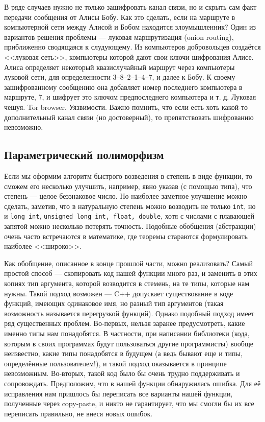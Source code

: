 \documentclass{book}
\begin{document}
В ряде случаев нужно не только зашифровать канал связи, но и скрыть сам факт передачи сообщения от
Алисы Бобу. Как это сделать, если на маршруте в компьютерной сети между Алисой и Бобом находится
злоумышленник? Один из вариантов решения проблемы --- луковая маршрутизация (onion routing),
приближенно сводящаяся к слудующему. Из компьютеров добровольцев создаётся <<луковая сеть>>,
компьютеры которой дают свои ключи шифрования Алисе. Алиса определяет некоторый квазислучайный
маршрут через компьютеры луковой сети, для определенности 3--8--2--1--4--7, и далее к Бобу. К
своему зашифрованному сообщению она добавляет номер последнего компьютера в маршруте, 7, и шифрует
это ключом предпоследнего компьютера и т. д. Луковая чешуя. Tor browser. Уязвимости. Важно помнить,
что если есть хоть какой-то дополнительный канал связи (но достоверный), то препятствовать
шифрованию невозможно.

\subsection{Параметрический полиморфизм}

Если мы оформим алгоритм быстрого возведения в степень в виде функции, то сможем его несколько
улучшить, например, явно указав (с помощью типа), что степень --- целое беззнаковое число. Но
наиболее заметное улучшение можно сделать, заметив, что в натуральную степень можно возводить не
только \texttt{int}, но и \texttt{long int}, \texttt{unsigned long int,
float, double}, хотя с числами с плавающей запятой можно несколько потерять точность. Подобные
обобщения (абстракции) очень часто встречаются в математике, где теоремы стараются формулировать
наиболее <<широко>>.

Как обобщение, описанное в конце прошлой части, можно реализовать? Самый простой способ ---
скопировать код нашей функции много раз, и заменить в этих копиях тип аргумента, которой возводится
в стемень, на те типы, которые нам нужны. Такой подход возможен --- C++ допускает существование в
коде функций, имеющих одинаковое имя, но разный тип аргументов (такая возможность называется
перегрузкой функций). Однако подобный подход имеет ряд существенных проблем. Во-первых, нельзя
заранее предусмотреть, какие именно типы нам понадобятся. В частности, при написании библиотеки
(кода, которым в своих программах будут пользоваться другие программисты) вообще неизвестно, какие
типы понадобятся в будущем (а ведь бывают еще и типы, определённые пользователем!), и такой подход
оказывается в принципе невозможным. Во-вторых, такой код было бы очень трудно поддерживать и
сопровождать. Предположим, что в нашей функции обнаружилась ошибка. Для её исправления нам пришлось
бы переписать все варианты нашей функции, полученные через copy-paste, и никто не гарантирует, что
мы смогли бы их все переписать правильно, не внеся новых ошибок.
\end{document}
